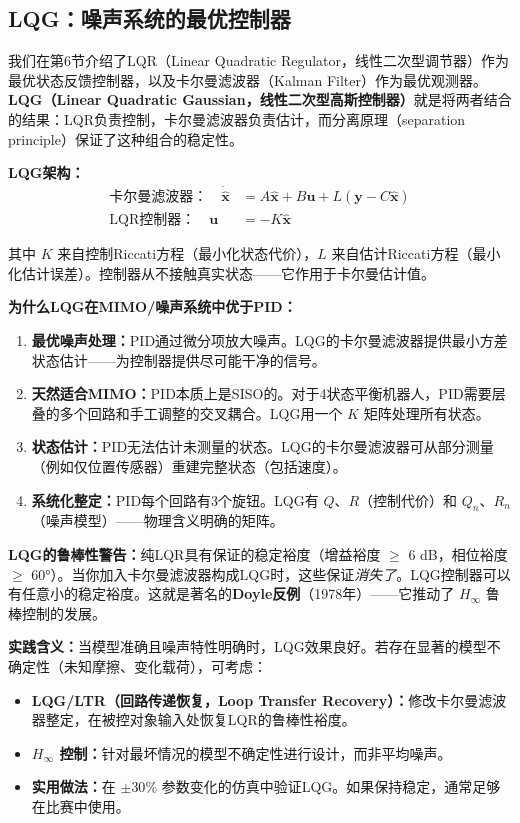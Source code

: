 \subsection{LQG：噪声系统的最优控制器}

我们在第6节介绍了LQR（Linear Quadratic Regulator，线性二次型调节器）作为最优状态反馈控制器，以及卡尔曼滤波器（Kalman Filter）作为最优观测器。\textbf{LQG（Linear Quadratic Gaussian，线性二次型高斯控制器）}就是将两者结合的结果：LQR负责控制，卡尔曼滤波器负责估计，而分离原理（separation principle）保证了这种组合的稳定性。

\textbf{LQG架构：}
\begin{align}
\text{卡尔曼滤波器：} \quad \dot{\hat{\mathbf{x}}} &= A\hat{\mathbf{x}} + B\mathbf{u} + L(\mathbf{y} - C\hat{\mathbf{x}}) \\
\text{LQR控制器：} \quad \mathbf{u} &= -K\hat{\mathbf{x}}
\end{align}

其中 $K$ 来自控制Riccati方程（最小化状态代价），$L$ 来自估计Riccati方程（最小化估计误差）。控制器从不接触真实状态——它作用于卡尔曼估计值。

\textbf{为什么LQG在MIMO/噪声系统中优于PID：}
\begin{enumerate}
    \item \textbf{最优噪声处理：}PID通过微分项放大噪声。LQG的卡尔曼滤波器提供最小方差状态估计——为控制器提供尽可能干净的信号。
    \item \textbf{天然适合MIMO：}PID本质上是SISO的。对于4状态平衡机器人，PID需要层叠的多个回路和手工调整的交叉耦合。LQG用一个 $K$ 矩阵处理所有状态。
    \item \textbf{状态估计：}PID无法估计未测量的状态。LQG的卡尔曼滤波器可从部分测量（例如仅位置传感器）重建完整状态（包括速度）。
    \item \textbf{系统化整定：}PID每个回路有3个旋钮。LQG有 $Q$、$R$（控制代价）和 $Q_n$、$R_n$（噪声模型）——物理含义明确的矩阵。
\end{enumerate}

\textbf{LQG的鲁棒性警告：}纯LQR具有保证的稳定裕度（增益裕度 $\geq$ 6 dB，相位裕度 $\geq$ 60°）。当你加入卡尔曼滤波器构成LQG时，这些保证\textit{消失了}。LQG控制器可以有任意小的稳定裕度。这就是著名的\textbf{Doyle反例}（1978年）——它推动了 $H_\infty$ 鲁棒控制的发展。

\textbf{实践含义：}当模型准确且噪声特性明确时，LQG效果良好。若存在显著的模型不确定性（未知摩擦、变化载荷），可考虑：
\begin{itemize}
    \item \textbf{LQG/LTR（回路传递恢复，Loop Transfer Recovery）：}修改卡尔曼滤波器整定，在被控对象输入处恢复LQR的鲁棒性裕度。
    \item \textbf{$H_\infty$ 控制：}针对最坏情况的模型不确定性进行设计，而非平均噪声。
    \item \textbf{实用做法：}在 $\pm 30\%$ 参数变化的仿真中验证LQG。如果保持稳定，通常足够在比赛中使用。
\end{itemize}

